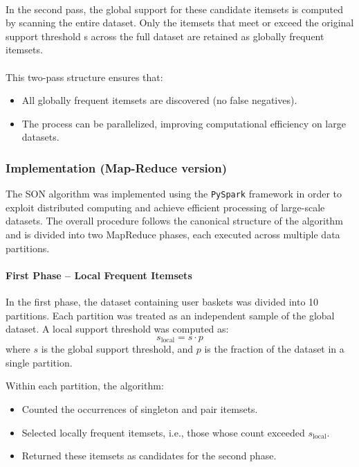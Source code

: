 \documentclass[a4paper,12pt]{article}
\begin{document}
\paragraph{}
In the second pass, the global support for these candidate itemsets is computed by scanning the entire dataset. Only the itemsets that meet or exceed the original support threshold s across the full dataset are retained as globally frequent itemsets.
\paragraph{}
This two-pass structure ensures that:
\begin{itemize}
    \item All globally frequent itemsets are discovered (no false negatives).
    \item The process can be parallelized, improving computational efficiency on large datasets.
\end{itemize}


\subsubsection{Implementation (Map-Reduce version)}


The SON algorithm was implemented using the \texttt{PySpark} framework in order to exploit distributed computing and achieve efficient processing of large-scale datasets. The overall procedure follows the canonical structure of the algorithm and is divided into two MapReduce phases, each executed across multiple data partitions.

\paragraph{First Phase – Local Frequent Itemsets}

In the first phase, the dataset containing user baskets was divided into 10 partitions. Each partition was treated as an independent sample of the global dataset. A local support threshold was computed as:
\[
s_{\text{local}} = s \cdot p
\]
where $s$ is the global support threshold, and $p$ is the fraction of the dataset in a single partition.

Within each partition, the algorithm:
\begin{itemize}
    \item Counted the occurrences of singleton and pair itemsets.
    \item Selected locally frequent itemsets, i.e., those whose count exceeded $s_{\text{local}}$.
    \item Returned these itemsets as candidates for the second phase.
\end{itemize}
\end{document}
